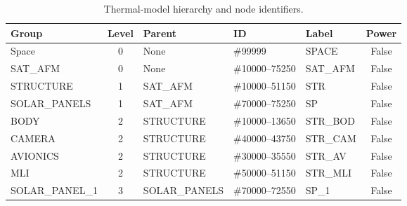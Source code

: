 
\begin{table}[H]
    \centering
    \caption{Thermal-model hierarchy and node identifiers.}
    \label{tab:subsystem-classification}

    \scriptsize
    \setlength{\tabcolsep}{2.5pt}
    \renewcommand{\arraystretch}{1.06}

    \begin{tabularx}{\textwidth}{
        |>{\raggedright\arraybackslash}X
        |c
        |>{\raggedright\arraybackslash}X
        |l
        |>{\raggedright\arraybackslash}X
        |c|
    }
        \hline
        \textbf{Group} &
        \textbf{Level} &
        \textbf{Parent} &
        \textbf{ID} &
        \textbf{Label} &
        \textbf{Power} \\
        \hline

        Space
        & 0 & None
        & \#99999
        & SPACE
        & False \\
        \hline

        SAT\_AFM
        & 0 & None
        & \#10000--75250
        & SAT\_AFM
        & False \\
        \hline

        STRUCTURE
        & 1 & SAT\_AFM
        & \#10000--51150
        & STR
        & False \\
        \hline

        SOLAR\_PANELS
        & 1 & SAT\_AFM
        & \#70000--75250
        & SP
        & False \\
        \hline

        BODY
        & 2 & STRUCTURE
        & \#10000--13650
        & STR\_BOD
        & False \\
        \hline

        CAMERA
        & 2 & STRUCTURE
        & \#40000--43750
        & STR\_CAM
        & False \\
        \hline

        AVIONICS
        & 2 & STRUCTURE
        & \#30000--35550
        & STR\_AV
        & False \\
        \hline

        MLI
        & 2 & STRUCTURE
        & \#50000--51150
        & STR\_MLI
        & False \\
        \hline

        SOLAR\_PANEL\_1
        & 3 & SOLAR\_PANELS
        & \#70000--72550
        & SP\_1
        & False \\
        \hline


\end{tabularx}
\end{table}
